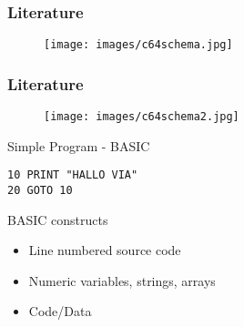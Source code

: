 \documentclass[aspectratio=43]{uva-inf-presentation}
\begin{document}

\begin{frame}
\frametitle{Literature}

\begin{figure}
\texttt{[image: images/c64schema.jpg]}
\end{figure}

\end{frame}


\begin{frame}
\frametitle{Literature}

\begin{figure}
\texttt{[image: images/c64schema2.jpg]}
\end{figure}

\end{frame}


\begin{frame}[fragile]{Simple Program - BASIC}

\begin{lstlisting}
10 PRINT "HALLO VIA"
20 GOTO 10
\end{lstlisting}

\end{frame}


\begin{frame}{BASIC constructs}

\begin{itemize}
\item Line numbered source code
\item Numeric variables, strings, arrays
\item Code/Data
\end{itemize}

\end{frame}

\end{document}
